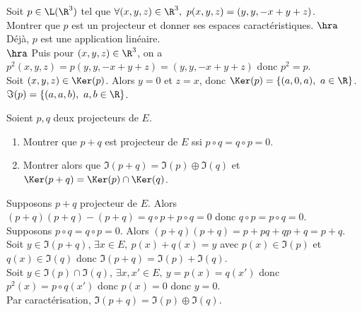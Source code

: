 \documentclass[11pt]{article}
\begin{document}
\vspace*{-0.9cm}

\begin{ex}{}{}
    Soit $p\in\L(\R^3)$ tel que $\forall (x,y,z)\in\R^3, ~ p(x,y,z)=(y,y,-x+y+z)$.\\
    Montrer que $p$ est un projecteur et donner ses espaces caractéristiques.
    \tcblower
    $\hra$ Déjà, $p$ est une application linéaire.\\
    $\hra$ Puis pour $(x,y,z)\in\R^3$, on a $p^2(x,y,z)=p(y,y,-x+y+z)=(y,y,-x+y+z)$ donc $p^2=p$.\\
     Soit $(x,y,z)\in\Ker(p)$. Alors $y=0$ et $z=x$, donc $\Ker(p)=\{(a,0,a), ~ a\in\R\}$.\\
     $\Im(p)=\{(a,a,b), ~ a,b\in\R\}$.
\end{ex}

\vspace*{-0.9cm}

\begin{ex}{}{}
    Soient $p,q$ deux projecteurs de $E$.
    \begin{enumerate}
        \item Montrer que $p+q$ est projecteur de $E$ ssi $p\circ q=q\circ p=0$.
        \item Montrer alors que $\Im(p+q)=\Im(p)\oplus\Im(q)$ et $\Ker(p+q)=\Ker(p)\cap\Ker(q)$.
    \end{enumerate}
    \tcblower
     Supposons $p+q$ projecteur de $E$. Alors $(p+q)(p+q)-(p+q)=q\circ p+p\circ q=0$ donc $q\circ p=p\circ q=0$.\\
     Supposons $p\circ q=q\circ p=0$. Alors $(p+q)(p+q)=p+pq+qp+q=p+q$.\\
     Soit $y\in\Im(p+q)$, $\exists x \in E, ~ p(x)+q(x)=y$ avec $p(x)\in\Im(p)$ et $q(x)\in\Im(q)$ donc $\Im(p+q)=\Im(p)+\Im(q)$.\\
    Soit $y\in\Im(p)\cap\Im(q)$, $\exists x,x'\in E, ~ y=p(x)=q(x')$ donc $p^2(x)=p\circ q(x')$ donc $p(x)=0$ donc $y=0$.\\
    Par caractérisation, $\Im(p+q)=\Im(p)\oplus\Im(q)$.
\end{ex}
\end{document}
